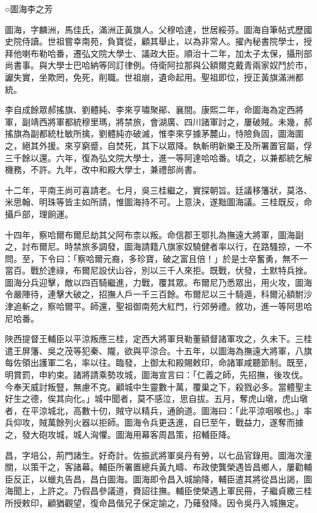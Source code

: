 
\begin{pinyinscope}
○圖海李之芳

圖海，字麟洲，馬佳氏，滿洲正黃旗人。父穆哈達，世居綏芬。圖海自筆帖式歷國史院侍讀。世祖嘗幸南苑，負寶從，顧其舉止，以為非常人。擢內秘書院學士，授拜他喇布勒哈番，遷弘文院大學士、議政大臣。順治十二年，加太子太保，攝刑部尚書事。與大學士巴哈納等同訂律例。侍衛阿拉那與公額爾克戴青兩家奴鬥於市，讞失實，坐欺罔，免死，削職。世祖崩，遺命起用。聖祖即位，授正黃旗滿洲都統。

李自成餘眾郝搖旗、劉體純、李來亨嘯聚鄖、襄間。康熙二年，命圖海為定西將軍，副靖西將軍都統穆里瑪，將禁旅，會湖廣、四川諸軍討之，屢破賊。未幾，郝搖旗為副都統杜敏所擒，劉體純亦破滅，惟李來亨據茅麓山，恃險負固，圖海圍之，絕其外援。來亨窮蹙，自焚死，其下以眾降。執斬明新樂王及所署置官屬，俘三千餘以還。六年，復為弘文院大學士，進一等阿達哈哈番。頃之，以兼都統乞解機務，不許。九年，改中和殿大學士，兼禮部尚書。

十二年，平南王尚可喜請老。七月，吳三桂繼之，實探朝旨。廷議移籓狀，莫洛、米思翰、明珠等皆主如所請，惟圖海持不可。上意決，遂黜圖海議。三桂既反，命攝戶部，理餉運。

十四年，察哈爾布爾尼劫其父阿布柰以叛。命信郡王鄂扎為撫遠大將軍，圖海副之，討布爾尼。時禁旅多調發，圖海請籍八旗家奴驍健者率以行，在路騷掠，一不問。至，下令曰：「察哈爾元裔，多珍寶，破之富且倍！」於是士卒奮勇，無不一當百。戰於達祿，布爾尼設伏山谷，別以三千人來拒。既戰，伏發，土默特兵挫。圖海分兵迎擊，敵以四百騎繼進，力戰，覆其眾。布爾尼乃悉眾出，用火攻，圖海令嚴陣待，連擊大破之，招撫人戶一千三百餘。布爾尼以三十騎遁，科爾沁額駙沙津追斬之，察哈爾平。師還，聖祖御南苑大紅門，行郊勞禮。敘功，進一等阿思哈尼哈番。

陜西提督王輔臣以平涼叛應三桂，定西大將軍貝勒董額督諸軍攻之，久未下。三桂遣王屏籓、吳之茂等犯秦、隴，欲與平涼合。十五年，以圖海為撫遠大將軍，八旗每佐領出護軍二名，率以往。臨發，上御太和殿賜敕印，命諸軍咸聽節制。既至，明賞罰，申約束。諸將請乘勢攻城，圖海宣言曰：「仁義之師，先招撫，後攻伐。今奉天威討叛豎，無慮不克。顧城中生靈數十萬，覆巢之下，殺戮必多。當體聖主好生之德，俟其向化。」城中聞者，莫不感泣，思自拔。五月，奪虎山墩，虎山墩者，在平涼城北，高數十仞，賊守以精兵，通餉道。圖海曰：「此平涼咽喉也。」率兵仰攻，賊萬餘列火器以拒師。圖海令兵更迭進，自巳至午，戰益力，遂奪而據之，發大砲攻城，城人洶懼。圖海用幕客周昌策，招輔臣降。

昌，字培公，荊門諸生。好奇計。佐振武將軍吳丹有勞，以七品官錄用。圖海次潼關，以策干之，客諸幕。輔臣所署置總兵黃九疇、布政使龔榮遇皆昌鄉人，屢勸輔臣反正，以蠟丸告昌，昌白圖海。圖海即令昌入城諭降，輔臣遣其將從昌出謁，圖海聞上，上許之。乃假昌參議道，賚詔往撫。輔臣使榮遇上軍民冊，子繼貞繳三桂所授敕印，顧猶觀望，復命昌偕兄子保定諭之，乃薙發降。因令吳丹入城撫定。


\end{pinyinscope}
